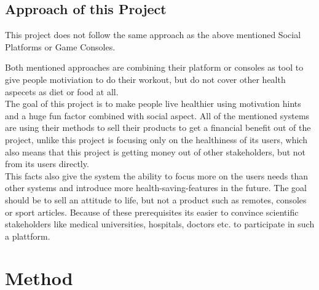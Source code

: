 \documentclass[a4paper,11pt]{article}
\providecommand*{\note}[1]{\small \textcolor{RoyalBlue}{\begin{minipage}{\textwidth}{#1}\end{minipage}}}
\begin{document}
\pagebreak

\subsection{Approach of this Project}
This project does not follow the same approach as the above mentioned Social Platforms or Game Consoles.

Both mentioned approaches are combining their platform or consoles as tool to give people motiviation to do their workout, but do not cover other health aspecets as diet or food at all. \\

The goal of this project is to make people live healthier using motivation hints and a huge fun factor combined with social aspect. All of the mentioned systems are using their methods to sell their products to get a financial benefit out of the project, unlike this project is focusing only on the healthiness of its users, which also means that this project is getting money out of other stakeholders, but not from its users directly. \\

This facts also give the system the ability to focus more on the users needs than other systems and introduce more health-saving-features in the future. The goal should be to sell an attitude to life, but not a product such as remotes, consoles or sport articles. Because of these prerequisites its easier to convince scientific stakeholders like medical universities, hospitals, doctors etc. to participate in such a plattform.

\pagebreak
\section{Method}
\label{sect:method}


\end{document}
